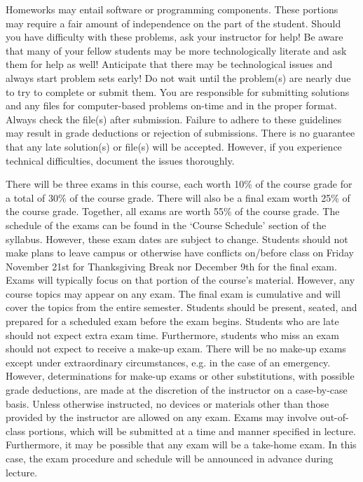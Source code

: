 \documentclass[11pt,letterpaper]{article}
\begin{document}
Homeworks may entail software or programming components. These portions may require a fair amount of independence on the part of the student. Should you have difficulty with these problems, ask your instructor for help! Be aware that many of your fellow students may be more technologically literate and ask them for help as well! Anticipate that there may be technological issues and always start problem sets early! Do not wait until the problem(s) are nearly due to try to complete or submit them. You are responsible for submitting solutions and any files for computer-based problems on-time and in the proper format. Always check the file(s) after submission. Failure to adhere to these guidelines may result in grade deductions or rejection of submissions. There is no guarantee that any late solution(s) or file(s) will be accepted. However, if you experience technical difficulties, document the issues thoroughly. 
\sectionbreak




There will be three exams in this course, each worth 10\% of the course grade for a total of 30\% of the course grade. There will also be a final exam worth 25\% of the course grade. Together, all exams are worth 55\% of the course grade. The schedule of the exams can be found in the `Course Schedule' section of the syllabus. However, these exam dates are subject to change. Students should not make plans to leave campus or otherwise have conflicts on/before class on Friday November 21st for Thanksgiving Break nor December 9th for the final exam. Exams will typically focus on that portion of the course's material. However, any course topics may appear on any exam. The final exam is cumulative and will cover the topics from the entire semester. Students should be present, seated, and prepared for a scheduled exam before the exam begins. Students who are late should not expect extra exam time. Furthermore, students who miss an exam should not expect to receive a make-up exam. There will be no make-up exams except under extraordinary circumstances, e.g. in the case of an emergency. However, determinations for make-up exams or other substitutions, with possible grade deductions, are made at the discretion of the instructor on a case-by-case basis. Unless otherwise instructed, no devices or materials other than those provided by the instructor are allowed on any exam. Exams may involve out-of-class portions, which will be submitted at a time and manner specified in lecture. Furthermore, it may be possible that any exam will be a take-home exam. In this case, the exam procedure and schedule will be announced in advance during lecture. 
\sectionbreak
\end{document}
